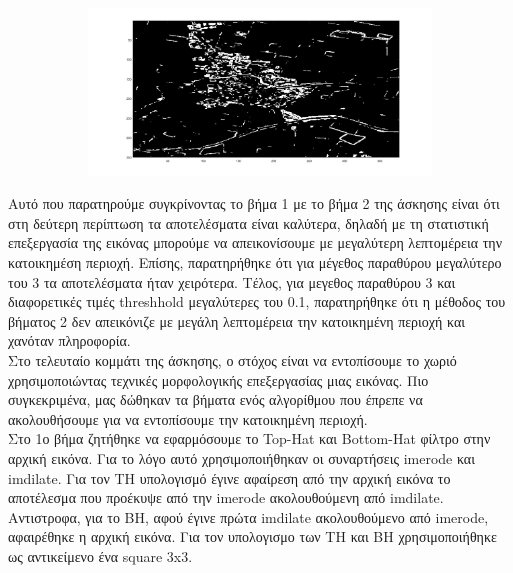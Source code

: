 \documentclass{article}
\begin{document}
\begin{figure}[h!]
\begin{subfigure}[t]{0.5\textwidth}
			\includegraphics[height=\linewidth, width=\linewidth]{./output_images/lab6_step2b.jpg}
		\end{subfigure}	
	\end{figure}
	
	\noindent
	Aυτό που παρατηρούμε συγκρίνοντας το βήμα 1 με το βήμα 2 της άσκησης είναι ότι στη δεύτερη περίπτωση τα αποτελέσματα είναι καλύτερα, δηλαδή με τη στατιστική επεξεργασία της εικόνας μπορούμε να απεικονίσουμε με μεγαλύτερη λεπτομέρεια την κατοικημέση περιοχή. Επίσης, παρατηρήθηκε ότι για μέγεθος παραθύρου μεγαλύτερο του 3 τα αποτελέσματα ήταν χειρότερα. Τέλος, για μεγεθος παραθύρου 3 και διαφορετικές τιμές threshhold μεγαλύτερες του 0.1, παρατηρήθηκε ότι η μέθοδος του βήματος 2 δεν απεικόνιζε με μεγάλη λεπτομέρεια την κατοικημένη περιοχή και χανόταν πληροφορία.\\
	
	\noindent
	Στο τελευταίο κομμάτι της άσκησης, ο στόχος είναι να εντοπίσουμε το χωριό χρησιμοποιώντας τεχνικές μορφολογικής επεξεργασίας μιας εικόνας. Πιο συγκεκριμένα, μας δώθηκαν τα βήματα ενός αλγορίθμου που έπρεπε να ακολουθήσουμε για να εντοπίσουμε την κατοικημένη περιοχή.\\
	
	\noindent
	Στο 1ο βήμα ζητήθηκε να εφαρμόσουμε το Top-Hat και Bottom-Hat φίλτρο στην αρχική εικόνα. Για το λόγο αυτό χρησιμοποιήθηκαν οι συναρτήσεις imerode και imdilate. Για τον TH υπολογισμό έγινε αφαίρεση από την αρχική εικόνα το αποτέλεσμα που προέκυψε από την imerode ακολουθούμενη από imdilate. Αντιστροφα, για το BH, αφού έγινε πρώτα imdilate ακολουθούμενο από imerode, αφαιρέθηκε η αρχική εικόνα. Για τον υπολογισμο των TH και BH χρησιμοποιήθηκε ως αντικείμενο ένα square 3x3. 	
	
\end{document}
